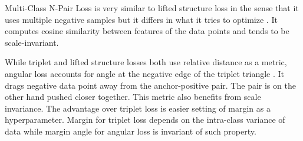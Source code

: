 Multi-Class N-Pair Loss is very similar to lifted structure loss in the sense that it uses multiple negative samples but it differs in what it tries to optimize \cite{multiclass-NIPS2016_6b180037}. It computes cosine similarity between features of the data points and tends to be scale-invariant. 

While triplet and lifted structure losses both use relative distance as a metric, angular loss accounts for angle at the negative edge of the triplet triangle \cite{angular-loss}. It drags negative data point away from the anchor-positive pair. The pair is on the other hand pushed closer together. This metric also benefits from scale invariance. The advantage over triplet loss is easier setting of margin as a hyperparameter. Margin for triplet loss depends on the intra-class variance of data while margin angle for angular loss is invariant of such property.
